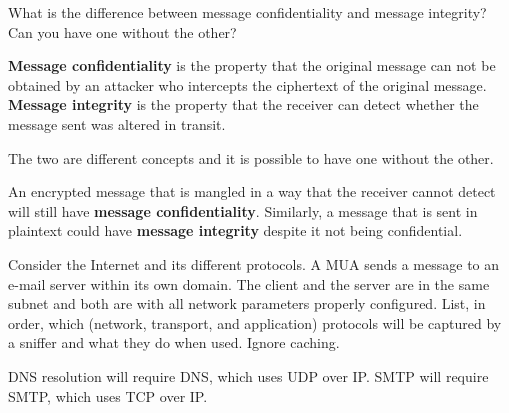 \begin{Exercise}
What is the difference between message confidentiality and message integrity? Can you have one without the other?
\end{Exercise}
\begin{Answer}
\textbf{Message confidentiality} is the property that the original message can not be obtained by an attacker who intercepts the ciphertext of the original message.
\textbf{Message integrity} is the property that the receiver can detect whether the message sent was altered in transit.

The two are different concepts and it is possible to have one without the other.

An encrypted message that is mangled in a way that the receiver cannot detect will still have \textbf{message confidentiality}.
Similarly, a message that is sent in plaintext could have \textbf{message integrity} despite it not being confidential.
\end{Answer}

\begin{Exercise}
Consider the Internet and its different protocols. A MUA sends a message to an e-mail server within its own domain. The client and the server are in the same subnet and both are with all network parameters properly configured. List, in order, which (network, transport, and application) protocols will be captured by a sniffer and what they do when used. Ignore caching.
\end{Exercise}
\begin{Answer}
DNS resolution will require DNS, which uses UDP over IP.
SMTP will require SMTP, which uses TCP over IP.
\end{Answer}

\begin{Exercise}
\end{Exercise}

\begin{Exercise}
\end{Exercise}

\begin{Exercise}
\end{Exercise}

\begin{Exercise}
\end{Exercise}

